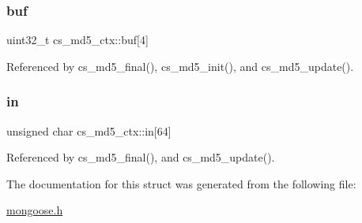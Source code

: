 \subsubsection{\texorpdfstring{buf}{buf}}
{\footnotesize\ttfamily uint32\+\_\+t cs\+\_\+md5\+\_\+ctx\+::buf\mbox{[}4\mbox{]}}



Referenced by cs\+\_\+md5\+\_\+final(), cs\+\_\+md5\+\_\+init(), and cs\+\_\+md5\+\_\+update().

\mbox{\label{structcs__md5__ctx_a950ebb13dee2724d8d60d9d558d1757d_a950ebb13dee2724d8d60d9d558d1757d}} 
\subsubsection{\texorpdfstring{in}{in}}
{\footnotesize\ttfamily unsigned char cs\+\_\+md5\+\_\+ctx\+::in\mbox{[}64\mbox{]}}



Referenced by cs\+\_\+md5\+\_\+final(), and cs\+\_\+md5\+\_\+update().



The documentation for this struct was generated from the following file\+:\begin{DoxyCompactItemize}
\item 
\hyperlink{mongoose_8h}{mongoose.\+h}\end{DoxyCompactItemize}
